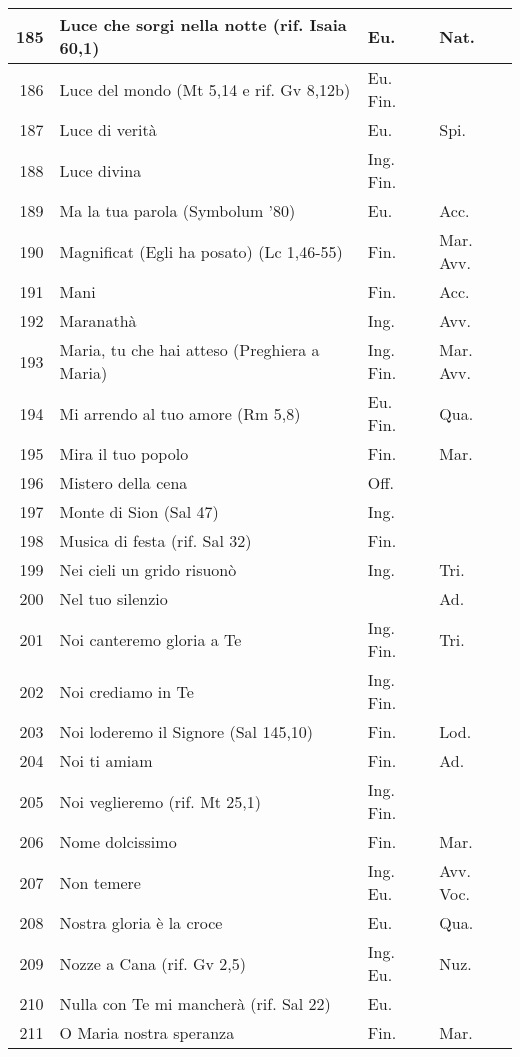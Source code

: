 {\begin{center}
\begin{longtable}{ | r | m{4.7cm} | m{1.8cm} | m{2cm}  |}
    185 & Luce che sorgi nella notte (rif. Isaia 60,1) & Eu. & Nat.\\ \hline
    186 & Luce del mondo (Mt 5,14 e rif. Gv 8,12b) & Eu. Fin. & \\ \hline
    187 & Luce di verità & Eu. & Spi.\\ \hline
    188 & Luce divina & Ing. Fin. & \\ \hline
    189 & Ma la tua parola (Symbolum '80) & Eu. & Acc.\\ \hline
    190 & Magnificat (Egli ha posato) (Lc 1,46-55) & Fin. & Mar. Avv.\\ \hline
    191 & Mani & Fin. & Acc.\\ \hline
    192 & Maranathà & Ing. & Avv.\\ \hline
    193 & Maria, tu che hai atteso (Preghiera a Maria) & Ing. Fin. & Mar. Avv.\\ \hline
    194 & Mi arrendo al tuo amore (Rm 5,8) & Eu. Fin. & Qua.\\ \hline
    195 & Mira il tuo popolo & Fin. & Mar.\\ \hline
    196 & Mistero della cena & Off. & \\ \hline
    197 & Monte di Sion (Sal 47) & Ing. & \\ \hline
    198 & Musica di festa (rif. Sal 32) & Fin. & \\ \hline
    199 & Nei cieli un grido risuonò & Ing. & Tri.\\ \hline
    200 & Nel tuo silenzio &  & Ad.\\ \hline
    201 & Noi canteremo gloria a Te & Ing. Fin. & Tri.\\ \hline
    202 & Noi crediamo in Te & Ing. Fin. & \\ \hline
    203 & Noi loderemo il Signore (Sal 145,10) & Fin. & Lod.\\ \hline
    204 & Noi ti amiam & Fin. & Ad.\\ \hline
    205 & Noi veglieremo (rif. Mt 25,1) & Ing. Fin. & \\ \hline
    206 & Nome dolcissimo & Fin. & Mar.\\ \hline
    207 & Non temere & Ing. Eu. & Avv. Voc.\\ \hline
    208 & Nostra gloria è la croce & Eu. & Qua.\\ \hline
    209 & Nozze a Cana (rif. Gv 2,5) & Ing. Eu. & Nuz.\\ \hline
    210 & Nulla con Te mi mancherà (rif. Sal 22) & Eu. & \\ \hline
    211 & O Maria nostra speranza & Fin. & Mar.\\ \hline

\end{longtable}
\end{center}}
